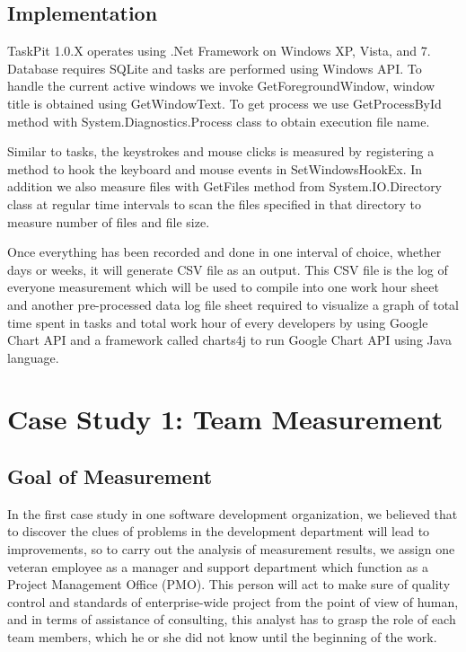 \documentclass [paper]{ieice}
\begin{document}
\subsection{Implementation}
	TaskPit 1.0.X operates using .Net Framework on  Windows XP, Vista, and 7. Database requires SQLite and tasks are performed using Windows API. To handle the current active windows we invoke GetForegroundWindow, window title is obtained using GetWindowText. To get process we use GetProcessById method with System.Diagnostics.Process class to obtain execution file name. \par
	Similar to tasks, the keystrokes and mouse clicks is measured by registering a method to hook the keyboard and mouse events in SetWindowsHookEx. In addition we also measure files with GetFiles method from System.IO.Directory class at regular time intervals to scan the files specified in that directory to measure number of files and file size. \par
	Once everything has been recorded and done in one interval of choice, whether days or weeks, it will generate CSV file as an output. This CSV file is the log of everyone measurement which will be used to compile into one work hour sheet and another pre-processed data log file sheet required to visualize a graph of total time spent in tasks and total work hour of every developers by using Google Chart API and a framework called charts4j to run Google Chart API using Java language.
	
\section{Case Study 1: Team Measurement}

\subsection{Goal of Measurement}
	In the first case study in one software development organization, we believed that to discover the clues of problems in the development department will lead to improvements, so to carry out the analysis of measurement results, we assign one veteran employee as a manager and support department which function as a Project Management Office (PMO). This person will act to make sure of quality control and standards of enterprise-wide project from the point of view of human, and in terms of assistance of consulting, this analyst has to grasp the role of each team members, which he or she did not know until the beginning of the work.
	
\end{document}
